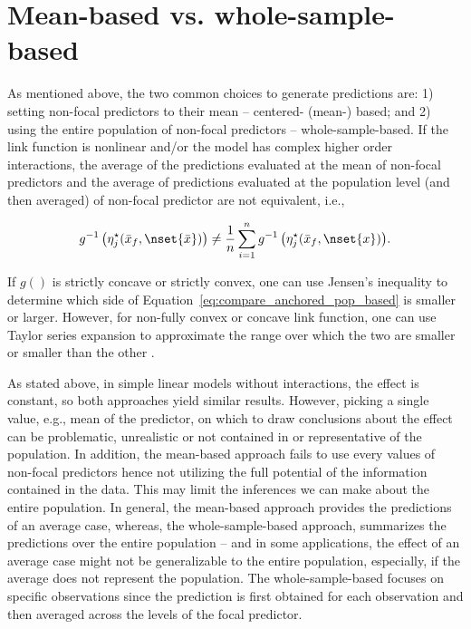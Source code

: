 \section*{Mean-based vs. whole-sample-based}

As mentioned above, the two common choices to generate predictions are: 1) setting non-focal predictors to their mean -- centered- (mean-) based; and 2) using the entire population of non-focal predictors -- whole-sample-based. If the link function is nonlinear and/or the model has complex higher order interactions, the average of the predictions evaluated at the mean of non-focal predictors and the average of predictions evaluated at the population level (and then averaged) of non-focal predictor are not equivalent, i.e.,

\begin{align}\label{eq:compare_anchored_pop_based}
g^{-1} \left(\eta_j^\star(\bar{x}_f, \nset{\bar{x}})\right) \neq \frac{1}{n} \sum_{i=1}^n{ g^{-1} \left(\eta_j^\star(\bar{x}_f, \nset{x})\right)}.
\end{align}

If $g()$ is strictly concave or strictly convex, one can use Jensen's inequality to determine which side of Equation~\ref{eq:compare_anchored_pop_based} is smaller or larger. However, for non-fully convex or concave link function, one can use Taylor series expansion to approximate the range over which the two are smaller or smaller than the other \citep{hanmer2013behind}. 


As stated above, in simple linear models without interactions, the effect is constant, so both approaches yield similar results. However, picking a single value, e.g., mean of the predictor, on which to draw conclusions about the effect can be problematic, unrealistic or not contained in or representative of the population. In addition, the mean-based approach fails to use every values of non-focal predictors hence not utilizing the full potential of the information contained in the data. This may limit the inferences we can make about the entire population. In general, the mean-based approach provides the predictions of an average case, whereas, the whole-sample-based approach, summarizes the predictions over the entire population -- and in some applications, the effect of an average case might not be generalizable to the entire population, especially, if the average does not represent the population. The whole-sample-based focuses on specific observations since the prediction is first obtained for each observation and then averaged across the levels of the focal predictor.

